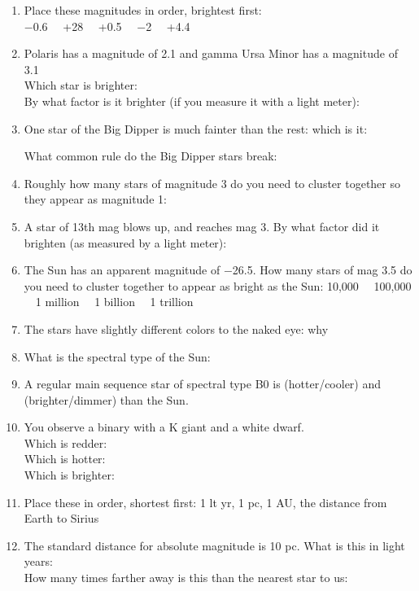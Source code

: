 \documentclass[11pt]{article}
\begin{document}
\begin{enumerate} 

\item
Place these magnitudes in order, brightest first: \\
$-$0.6 \ \ +28 \ \ +0.5 \ \ $-$2 \ \ +4.4 


\item Polaris has a magnitude of 2.1 and gamma Ursa Minor has a
magnitude of 3.1 \\
Which star is brighter: \\
By what factor is it brighter (if you measure it with a light meter):

\item
One star of the Big Dipper is much fainter than the rest: which is it:

\medskip
What common rule do the Big Dipper stars break:

\item 
Roughly how many stars of magnitude 3 do you need to cluster together
so they appear as magnitude 1: 

\item 
A star of  13th mag blows up, and reaches mag 3.  By what factor did
it brighten (as measured by a light meter): 

\item 
The Sun has an apparent magnitude of $-$26.5. How many stars of mag 3.5
do you need to cluster together to appear as bright as the Sun: 
10,000 \ \  100,000 \ \ 1 million \ \ 1 billion \ \  1 trillion 

\item
The stars have slightly different colors to the naked eye: why

\item 
What is the spectral type of the Sun:

\item 
A regular main sequence star of spectral type B0 is (hotter/cooler) and
(brighter/dimmer) than the Sun.

\item 
You observe a binary with a K giant and a white dwarf. \\
Which is redder:\\
Which is hotter: \\
Which is brighter: 

\item
Place these in order, shortest first: 1 lt yr, 1 pc, 1 AU, the
distance from Earth to Sirius

\item 
The standard distance for absolute magnitude is 10 pc. 
What is this in light years: \\
How many times farther away is this than the nearest star to us:


\end{enumerate}
\end{document}
